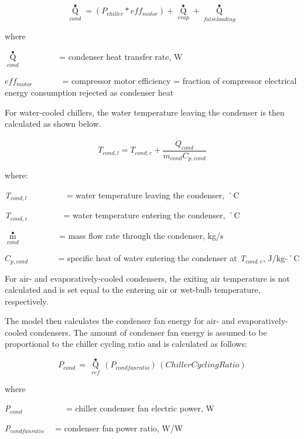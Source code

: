 \begin{equation}
{\mathop Q\limits^ \bullet_{cond}} = \left( {{P_{chiller}} * ef{f_{motor}}} \right) + {\mathop Q\limits^ \bullet_{evap}} + {\mathop Q\limits^ \bullet_{falseloading}}
\end{equation}

where

\({\mathop Q\limits^ \bullet_{cond}}\) ~~~~~~~~ = condenser heat transfer rate, W

\(ef{f_{motor}}\) ~~~~~~ = compressor motor efficiency = fraction of compressor electrical energy consumption rejected as condenser heat

For water-cooled chillers, the water temperature leaving the condenser is then calculated as shown below.

\begin{equation} 
  T_{cond,l} = T_{cond,e} + \frac{\dot{Q}_{cond}}{\dot{m}_{cond}C_{p,cond}}
\end{equation}

where:

\emph{T\(_{cond,l}\)}~~~~~~~~~ = water temperature leaving the condenser, ˚C

\emph{T\(_{cond,e}\)}~~~~~~~~ = water temperature entering the condenser, ˚C

\({\mathop m\limits^ \bullet_{cond}}\) ~~~~~~~~ = mass flow rate through the condenser, kg/s

\({C_{p,cond}}\) ~~~~~~ = specific heat of water entering the condenser at \emph{T\(_{cond,e}\)}, J/kg-˚C

For air- and evaporatively-cooled condensers, the exiting air temperature is not calculated and is set equal to the entering air or wet-bulb temperature, respectively.

The model then calculates the condenser fan energy for air- and evaporatively-cooled condensers. The amount of condenser fan energy is assumed to be proportional to the chiller cycling ratio and is calculated as follows:

\begin{equation}
{P_{cond}}\, = \,{\mathop Q\limits^ \bullet_{ref}}\,\left( {{P_{condfanratio}}} \right)\,\left( {ChillerCyclingRatio} \right)
\end{equation}

where

\emph{P\(_{cond}\)}~~~~~~~~~~ = chiller condenser fan electric power, W

\emph{P\(_{condfanratio}\)}~~ = condenser fan power ratio, W/W

